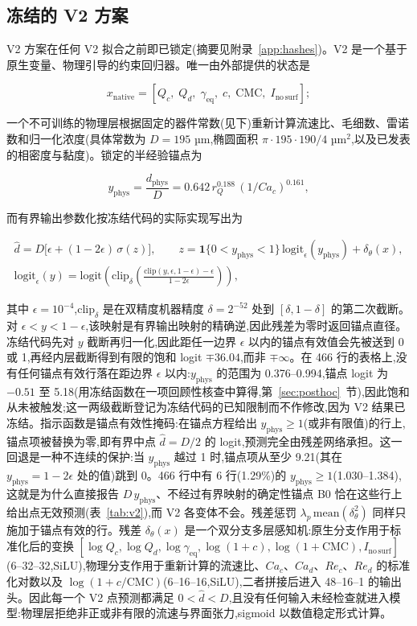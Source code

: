 \documentclass[11pt,a4paper]{ctexart}
\begin{document}
\subsection{冻结的 V2 方案}
\label{sec:v2protocol}

V2 方案在任何 V2 拟合之前即已锁定(摘要见附录~\ref{app:hashes})。V2 是一个基于原生变量、物理引导的约束回归器。唯一由外部提供的状态是

\[
x_{\mathrm{native}}=[Q_c,\;Q_d,\;\gamma_{\mathrm{eq}},\;c,\;\mathrm{CMC},\;I_{\mathrm{no\,surf}}];
\]

一个不可训练的物理层根据固定的器件常数(见下)重新计算流速比、毛细数、雷诺数和归一化浓度(具体常数为 $D=195$ µm,椭圆面积 $\pi\cdot195\cdot190/4$ µm$^2$,以及已发表的相密度与黏度)。锁定的半经验锚点为

\[
y_{\mathrm{phys}} = \frac{d_{\mathrm{phys}}}{D} = 0.642\, r_Q^{0.188}\,(1/Ca_c)^{0.161},
\]

而有界输出参数化按冻结代码的实际实现写出为

\begin{gather*}
\hat d = D\bigl[\epsilon + (1-2\epsilon)\,\sigma(z)\bigr],
\qquad
z = \mathbf{1}\{0<y_{\mathrm{phys}}<1\}\,\mathrm{logit}_\epsilon(y_{\mathrm{phys}}) + \delta_\theta(x),\\
\mathrm{logit}_\epsilon(y) = \mathrm{logit}\!\left(\mathrm{clip}_\delta\!\left(\frac{\mathrm{clip}(y,\epsilon,1-\epsilon)-\epsilon}{1-2\epsilon}\right)\right),
\end{gather*}

其中 $\epsilon=10^{-4}$,$\mathrm{clip}_\delta$ 是在双精度机器精度 $\delta=2^{-52}$ 处到 $[\delta,1-\delta]$ 的第二次截断。对 $\epsilon<y<1-\epsilon$,该映射是有界输出映射的精确逆,因此残差为零时返回锚点直径。冻结代码先对 $y$ 截断再归一化,因此距任一边界 $\epsilon$ 以内的锚点有效值会先被送到 0 或 1,再经内层截断得到有限的饱和 logit $\mp 36.04$,而非 $\mp\infty$。在 466 行的表格上,没有任何锚点有效行落在距边界 $\epsilon$ 以内:$y_{\mathrm{phys}}$ 的范围为 0.376--0.994,锚点 logit 为 $-0.51$ 至 5.18(用冻结函数在一项回顾性核查中算得,第~\ref{sec:posthoc}~节),因此饱和从未被触发;这一两级截断登记为冻结代码的已知限制而不作修改,因为 V2 结果已冻结。指示函数是锚点有效性掩码:在锚点方程给出 $y_{\mathrm{phys}}\ge 1$(或非有限值)的行上,锚点项被替换为零,即有界中点 $\hat d=D/2$ 的 logit,预测完全由残差网络承担。这一回退是一种不连续的保护:当 $y_{\mathrm{phys}}$ 越过 1 时,锚点项从至少 9.21(其在 $y_{\mathrm{phys}}=1-2\epsilon$ 处的值)跳到 0。466 行中有 6 行(1.29\%)的 $y_{\mathrm{phys}}\ge 1$(1.030--1.384),这就是为什么直接报告 $D\,y_{\mathrm{phys}}$、不经过有界映射的确定性锚点 B0 恰在这些行上给出点无效预测(表~\ref{tab:v2}),而 V2 各变体不会。残差惩罚 $\lambda_p\,\mathrm{mean}(\delta_\theta^2)$ 同样只施加于锚点有效的行。残差 $\delta_\theta(x)$ 是一个双分支多层感知机:原生分支作用于标准化后的变换 $[\log Q_c,\log Q_d,\log\gamma_{\mathrm{eq}},\log(1+c),\log(1+\mathrm{CMC}),I_{\mathrm{no\,surf}}]$(6--32--32,SiLU),物理分支作用于重新计算的流速比、$Ca_c$、$Ca_d$、$Re_c$、$Re_d$ 的标准化对数以及 $\log(1+c/\mathrm{CMC})$(6--16--16,SiLU),二者拼接后进入 48--16--1 的输出头。因此每一个 V2 点预测都满足 $0<\hat d<D$,且没有任何输入未经检查就进入模型:物理层拒绝非正或非有限的流速与界面张力,sigmoid 以数值稳定形式计算。
\end{document}
